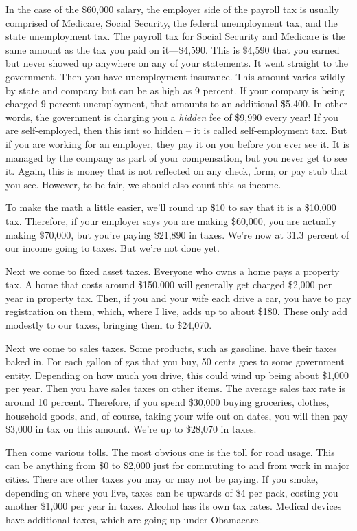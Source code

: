 In the case of the \$60,000 salary, the employer side of the payroll tax
is usually comprised of Medicare, Social Security, the federal
unemployment tax, and the state unemployment tax. The payroll tax for
Social Security and Medicare is the same amount as the tax you paid on
it—\$4,590. This is \$4,590 that you earned but never showed up
anywhere on any of your statements. It went straight to the government.
Then you have unemployment insurance. This amount varies wildly by
state and company but can be as high as 9 percent. If your company is
being charged 9 percent unemployment, that amounts to an additional
\$5,400. In other words, the government is charging you a
\textit{hidden} fee of \$9,990 every year!  If you are self-employed,
then this isn{\textquotesingle}t so hidden – it is called
self-employment tax.  But if you are working for an employer, they pay
it on you before you ever see it.  It is managed by the company as part
of your compensation, but you never get to see it.  Again, this is
money that is not reflected on any check, form, or pay stub that you
see. However, to be fair, we should also count this as income.


To make the math a little easier, we’ll round up \$10 to say that it is
a \$10,000 tax. Therefore, if your employer says you are making
\$60,000, you are actually making \$70,000, but you’re paying \$21,890
in taxes. We’re now at 31.3 percent of our income going to taxes. But
we’re not done yet.


Next we come to fixed asset taxes. Everyone who owns a home pays a
property tax. A  home that costs around \$150,000 will generally get
charged \$2,000 per year in property tax. Then, if you and your wife
each drive a car, you have to pay registration on them, which, where I
live, adds up to about \$180. These only add modestly to our taxes,
bringing them to \$24,070.


Next we come to sales taxes. Some products, such as gasoline, have their
taxes baked in. For each gallon of gas that you buy, 50 cents goes to
some government entity. Depending on how much you drive, this could
wind up being about \$1,000 per year. Then you have sales taxes on
other items. The average sales tax rate is around 10 percent.
Therefore, if you
spend \$30,000 buying groceries, clothes, household goods, and, of
course, taking your wife out on
dates, you will then
pay \$3,000 in tax on this amount.
We’re up to \$28,070
in taxes. 


Then come various
tolls. The most obvious one is the toll for road usage. This can be
anything from \$0 to \$2,000 just for commuting to and from work in
major cities.  There are other taxes you may or may not be paying. If
you smoke, depending on where you live, taxes can be upwards of \$4 per
pack, costing you another \$1,000 per year in taxes. Alcohol has its
own tax rates. Medical devices have additional taxes, which are going
up under Obamacare.


